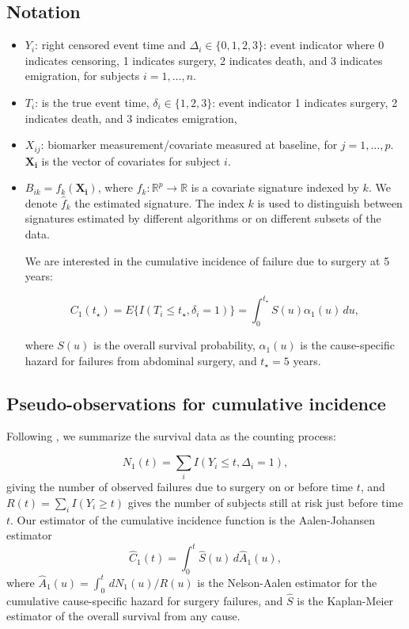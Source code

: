 \documentclass{statsoc}
\begin{document}
\subsection{Notation}

\begin{itemize}
\item $Y_i$: right censored event time and $\Delta_i \in \{0,1,2, 3\}$: event indicator where 0 indicates censoring, 1 indicates surgery, 2 indicates death, and 3 indicates emigration, for subjects $i = 1, \ldots, n$.
\item $T_i$: is the true event time, $\delta_i \in \{1,2,3\}$: event indicator 1 indicates surgery, 2 indicates death, and 3 indicates emigration, 
\item $X_{ij}$: biomarker measurement/covariate measured at baseline, for $j = 1, \ldots, p$. $\mathbf{X_i}$ is the vector of covariates for subject $i$.
\item $B_{ik} = f_k(\mathbf{X_i})$, where $f_k: \mathbb{R}^p \rightarrow \mathbb{R}$ is a covariate signature indexed by $k$. We denote $\hat{f}_k$ the estimated signature. The index $k$ is used to distinguish between signatures estimated by different algorithms or on different subsets of the data.

We are interested in the cumulative incidence of failure due to surgery at 5 years: 

\[
C_1(t_{\star}) = E\{I(T_i \leq t_{\star}, \delta_i = 1)\} = \int_{0}^{t_{\star}} S(u)\alpha_1(u) \,du,
\]

where $S(u)$ is the overall survival probability, $\alpha_1(u)$ is the cause-specific hazard for failures from abdominal surgery, and $t_{\star} = 5$ years. 

\end{itemize}




\subsection{Pseudo-observations for cumulative incidence}

Following \citet{andersen2010pseudo}, we summarize the survival data as the counting process: 

\[
N_1(t) = \sum_i I(Y_i \leq t, \Delta_i = 1), 
\]
giving the number of observed failures due to surgery on or before time $t$, and $R(t) = \sum_i I(Y_i \geq t)$ gives the number of subjects still at risk just before time $t$. Our estimator of the cumulative incidence function is the Aalen-Johansen estimator \citep{aalen1978empirical}
\[
\hat{C}_1(t) = \int_{0}^{t} \hat{S}(u)\, d\hat{A}_1(u), 
\]
where $\hat{A}_1(u) = \int_{0}^t \, dN_1(u) / R(u)$ is the Nelson-Aalen estimator for the cumulative cause-specific hazard for surgery failures, and $\hat{S}$ is the Kaplan-Meier estimator of the overall survival from any cause. 
\end{document}
